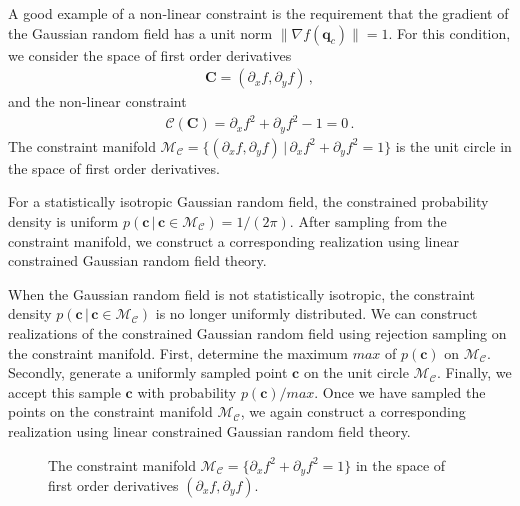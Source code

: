 \documentclass[a4paper, 11pt]{article}
\begin{document}
\begin{framed}
A good example of a non-linear constraint is the requirement that the gradient of the Gaussian random field has a unit norm $\|\nabla f(\bm{q}_c)\|=1$. For this condition, we consider the space of first order derivatives
\begin{align}
\bm{C}=(\partial_x f, \partial_y f)\,,
\end{align}
and the non-linear constraint 
\begin{align}
\mathcal{C}(\bm{C})=\partial_x f^2 +  \partial_y f^2 - 1=0\,.
\end{align}
The constraint manifold $\mathcal{M}_\mathcal{C}=\{(\partial_xf,\partial_yf)\, |\, \partial_xf^2+\partial_yf^2=1\}$ is the unit circle in the space of first order derivatives.

For a statistically isotropic Gaussian random field, the constrained probability density is uniform $p(\bm{c}\, |\, \bm{c}\in\mathcal{M}_\mathcal{C}) = 1/(2\pi)$. After sampling from the constraint manifold, we construct a corresponding realization using linear constrained Gaussian random field theory.

When the Gaussian random field is not statistically isotropic, the constraint density $p(\bm{c}\, |\, \bm{c}\in\mathcal{M}_\mathcal{C})$ is no longer uniformly distributed. We can construct realizations of the constrained Gaussian random field using rejection sampling on the constraint manifold. First, determine the maximum $max$ of $p(\bm{c})$ on $\mathcal{M}_\mathcal{C}$. Secondly, generate a uniformly sampled point $\bm{c}$ on the unit circle $\mathcal{M}_\mathcal{C}$. Finally, we accept this sample $\bm{c}$ with probability $p(\bm{c})/max$. Once we have sampled the points on the constraint manifold $\mathcal{M}_\mathcal{C}$, we again construct a corresponding realization using linear constrained Gaussian random field theory.
\end{framed}



\begin{figure}
\centering
\begin{subfigure}[b]{0.49\textwidth}
\end{subfigure}
\caption{The constraint manifold $\mathcal{M}_\mathcal{C}=\{\partial_xf^2+\partial_yf^2=1\}$ in the space of first order derivatives $(\partial_x f,\partial_yf)$.}
\end{figure}
\end{document}
